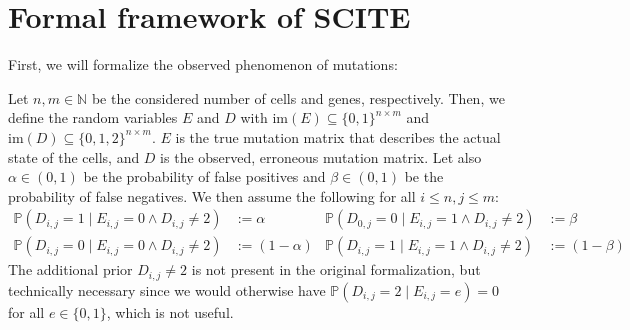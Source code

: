 \section{Formal framework of SCITE}

First, we will formalize the observed phenomenon of mutations:

\begin{definition}
    \label{def:mutmatrix}
    Let $n, m \in \mathbb{N}$ be the considered number of cells and genes, respectively. Then, we define the random variables $E$ and $D$ with $\mathrm{im}(E) \subseteq \{0,1\}^{n \times m}$ and $\mathrm{im}(D) \subseteq \{0, 1, 2\}^{n \times m}$. $E$ is the true mutation matrix that describes the actual state of the cells, and $D$ is the observed, erroneous mutation matrix. Let also $\alpha \in (0,1)$ be the probability of false positives and $\beta \in (0,1)$ be the probability of false negatives. We then assume the following for all $i \leq n, j \leq m$:
    \begin{align*}
        \mathbb{P}(D_{i,j} = 1 \mid E_{i,j} = 0 \wedge D_{i,j} \neq 2) &:= \alpha & \mathbb{P}(D_{0,j} = 0\mid E_{i,j} = 1 \wedge D_{i,j} \neq 2) &:= \beta \\
        \mathbb{P}(D_{i,j} = 0 \mid E_{i,j} = 0 \wedge D_{i,j} \neq 2) &:= (1-\alpha) & \mathbb{P}(D_{i,j} = 1 \mid E_{i,j} = 1 \wedge D_{i,j} \neq 2) &:= (1-\beta)
    \end{align*}
    The additional prior $D_{i,j} \neq 2$ is not present in the original formalization, but technically necessary since we would otherwise have $\mathbb{P}(D_{i,j} = 2 \mid E_{i,j} = e) = 0$ for all $e \in \{0,1\}$, which is not useful.
\end{definition}

